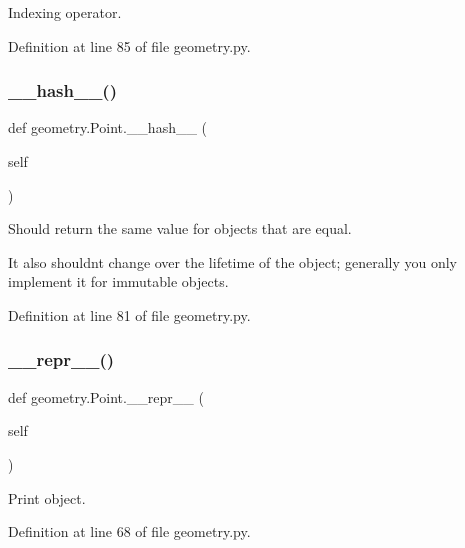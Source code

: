 Indexing operator. 



Definition at line 85 of file geometry.\+py.

\mbox{\label{classgeometry_1_1Point_ae9e26dfa297c49feb6e0c2808c74bba8}} 
\subsubsection{\texorpdfstring{\+\_\+\+\_\+hash\+\_\+\+\_\+()}{\_\_hash\_\_()}}
{\footnotesize\ttfamily def geometry.\+Point.\+\_\+\+\_\+hash\+\_\+\+\_\+ (\begin{DoxyParamCaption}\item[{}]{self }\end{DoxyParamCaption})}



Should return the same value for objects that are equal. 

It also shouldn\textquotesingle{}t change over the lifetime of the object; generally you only implement it for immutable objects. 

Definition at line 81 of file geometry.\+py.

\mbox{\label{classgeometry_1_1Point_aebe045ef26f241b525459dfa1ee3b85f}} 
\subsubsection{\texorpdfstring{\+\_\+\+\_\+repr\+\_\+\+\_\+()}{\_\_repr\_\_()}}
{\footnotesize\ttfamily def geometry.\+Point.\+\_\+\+\_\+repr\+\_\+\+\_\+ (\begin{DoxyParamCaption}\item[{}]{self }\end{DoxyParamCaption})}



Print object. 



Definition at line 68 of file geometry.\+py.

